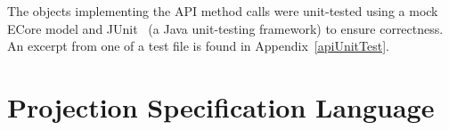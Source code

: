 \documentclass{article}
\begin{document}
{
The objects implementing the API method calls were unit-tested using a mock ECore model and JUnit~\cite{junit} (a Java unit-testing framework) to ensure correctness. An excerpt from one of a test file is found in Appendix~\ref{apiUnitTest}.

\section{Projection Specification Language}\label{EditorLanguage}
}
\end{document}
